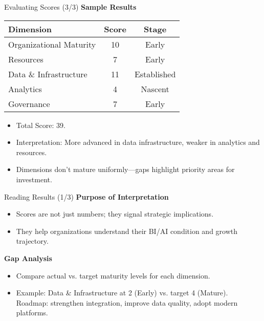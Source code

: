 \documentclass[aspectratio=169, table]{beamer}
\begin{document}
\begin{frame}{Evaluating Scores (3/3)}
	\vspace{20pt}
	\textbf{Sample Results}
	
	\begin{center}
		\setlength{\arrayrulewidth}{0.3mm} %
		\begin{tabular}{|l|c|c|}
			\hline
			\textbf{Dimension} & \textbf{Score} & \textbf{Stage} \\ \hline
			Organizational Maturity & 10 & Early \\ \hline
			Resources              & 7  & Early \\ \hline
			Data \& Infrastructure & 11 & Established \\ \hline
			Analytics              & 4  & Nascent \\ \hline
			Governance             & 7  & Early \\ \hline
		\end{tabular}
	\end{center}
	
	\begin{itemize}
		\item Total Score: 39.  
		\item Interpretation: More advanced in data infrastructure, weaker in analytics and resources.  
		\item Dimensions don’t mature uniformly—gaps highlight priority areas for investment.  
	\end{itemize}
\end{frame}


\begin{frame}{Reading Results (1/3)}
	\vspace{20pt}
	\textbf{Purpose of Interpretation}
	\begin{itemize}
		\item Scores are not just numbers; they signal strategic implications.  
		\item They help organizations understand their BI/AI condition and growth trajectory.  
	\end{itemize}
	
	\textbf{Gap Analysis}
	\begin{itemize}
		\item Compare actual vs. target maturity levels for each dimension.  
		\item Example: Data \& Infrastructure at 2 (Early) vs. target 4 (Mature).  
		Roadmap: strengthen integration, improve data quality, adopt modern platforms.  
	\end{itemize}
\end{frame}
\end{document}

